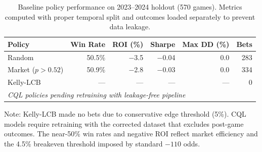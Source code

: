 \begin{table}[t]
  \centering
  \small
  \caption[RL vs stateless baseline]{Baseline policy performance on 2023--2024 holdout (570 games). Metrics computed with proper temporal split and outcomes loaded separately to prevent data leakage.}
  \label{tab:rl-vs-baseline}
  \begin{threeparttable}
  \begin{tabular}{lrrrrr}
    \toprule
    Policy & Win Rate & ROI (\%) & Sharpe & Max DD (\%) & Bets \\
    \midrule
    Random & 50.5\% & $-$3.5 & $-$0.04 & 0.0 & 283 \\
    Market ($p > 0.52$) & 50.9\% & $-$2.8 & $-$0.03 & 0.0 & 334 \\
    Kelly-LCB & --- & --- & --- & --- & 0 \\
    \midrule
    \multicolumn{6}{l}{\textit{CQL policies pending retraining with leakage-free pipeline}} \\
    \bottomrule
  \end{tabular}
  \begin{tablenotes}
    \small
    \item Note: Kelly-LCB made no bets due to conservative edge threshold (5\%). CQL models require retraining with the corrected dataset that excludes post-game outcomes. The near-50\% win rates and negative ROI reflect market efficiency and the 4.5\% breakeven threshold imposed by standard $-110$ odds.
  \end{tablenotes}
  \end{threeparttable}
\end{table}
